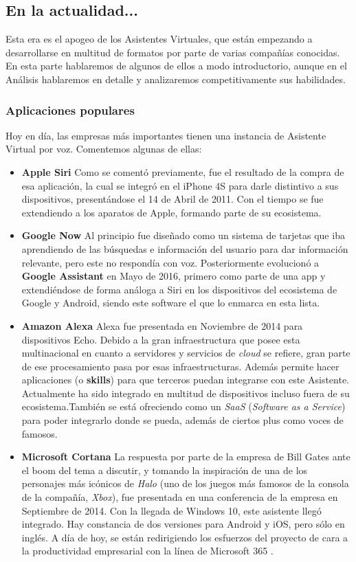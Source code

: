 \subsection{En la actualidad...}
Esta era es el apogeo de los Asistentes Virtuales, que están empezando a desarrollarse en multitud de formatos por parte de varias compañías conocidas. En esta parte hablaremos de algunos de ellos a modo introductorio, aunque en el Análisis hablaremos en detalle y analizaremos competitivamente sus habilidades.

\subsubsection {Aplicaciones populares}
Hoy en día, las empresas más importantes tienen una instancia de Asistente Virtual por voz. Comentemos algunas de ellas:

\begin{itemize}
	\item \textbf{Apple Siri} \cite{siri} Como se comentó previamente, fue el resultado de la compra de esa aplicación, la cual se integró en el iPhone 4S para darle distintivo a sus dispositivos, presentándose el 14 de Abril de 2011. Con el tiempo se fue extendiendo a los aparatos de Apple, formando parte de su ecosistema.
	\item \textbf{Google Now} Al principio fue diseñado como un sistema de tarjetas que iba aprendiendo de las búsquedas e información del usuario para dar información relevante, pero este no respondía con voz. Posteriormente evolucionó a \textbf{Google Assistant} \cite{google-assistant} en Mayo de 2016, primero como parte de una app y extendiéndose de forma análoga a Siri en los dispositivos del ecosistema de Google y Android, siendo este software el que lo enmarca en esta lista.
	\item \textbf{Amazon Alexa} \cite{alexa} Alexa fue presentada en Noviembre de 2014 para dispositivos Echo. Debido a la gran infraestructura que posee esta multinacional en cuanto a servidores y servicios de \textit{cloud} se refiere, gran parte de ese procesamiento pasa por esas infraestructuras. Además permite hacer aplicaciones (o \textbf{skills}) para que terceros puedan integrarse con este Asistente. Actualmente ha sido integrado en multitud de dispositivos incluso fuera de su ecosistema.También se está ofreciendo como un \textit{SaaS} (\textit{Software as a Service}) para poder integrarlo donde se pueda, además de ciertos plus como voces de famosos.
	\item \textbf{Microsoft Cortana} La respuesta por parte de la empresa de Bill Gates ante el boom del tema a discutir, y tomando la inspiración de una de los personajes más icónicos de \textit{Halo} (uno de los juegos más famosos de la consola de la compañía, \textit{Xbox}), fue presentada en una conferencia de la empresa en Septiembre de 2014. Con la llegada de Windows 10, este asistente llegó integrado. Hay constancia de dos versiones para Android y iOS, pero sólo en inglés. A día de hoy, se están redirigiendo los esfuerzos del proyecto de cara a la productividad empresarial con la línea de Microsoft 365 \cite{cortana}.
\end{itemize}


